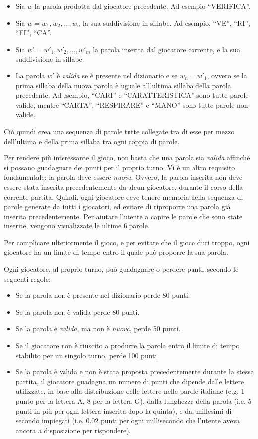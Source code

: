 \documentclass[10.5pt]{article}
\begin{document}
\begin{itemize}
\item Sia $w$ la parola prodotta dal giocatore precedente. Ad esempio ``VERIFICA''.
\item Sia $w=w_1, w_2, \dots, w_n$ la sua suddivisione in sillabe. Ad esempio, ``VE'', ``RI'', ``FI'', ``CA''.
\item Sia $w'=w'_1, w'_2, \dots, w'_m$ la parola inserita dal giocatore corrente, e la sua suddivisione in sillabe.
\item La parola $w'$ è \emph{valida} se è presente nel dizionario e se $w_n = w'_1$, ovvero se la prima sillaba della nuova parola è uguale all'ultima sillaba della parola precedente. Ad esempio, ``CARI'' e ``CARATTERISTICA'' sono tutte parole valide, mentre ``CARTA'', ``RESPIRARE'' e ``MANO'' sono tutte parole non valide.
\end{itemize}

Ciò quindi crea una sequenza di parole tutte collegate tra di esse per mezzo dell'ultima e della prima sillaba tra ogni coppia di parole. 

Per rendere più interessante il gioco, non basta che una parola sia \emph{valida} affinché si possano guadagnare dei punti per il proprio turno. Vi è un altro requisito fondamentale: la parola deve essere \emph{nuova}. Ovvero, la parola inserita non deve essere stata inserita precedentemente da alcun giocatore, durante il corso della corrente partita. Quindi, ogni giocatore deve tenere memoria della sequenza di parole generate da tutti i giocatori, ed evitare di riproporre una parola già inserita precedentemente. Per aiutare l'utente a capire le parole che sono state inserite, vengono visualizzate le ultime 6 parole.

Per complicare ulteriormente il gioco, e per evitare che il gioco duri troppo, ogni giocatore ha un limite di tempo entro il quale può proporre la sua parola.

Ogni giocatore, al proprio turno, può guadagnare o perdere punti, secondo le seguenti regole:
\begin{itemize}
\item Se la parola non è presente nel dizionario perde 80 punti.
\item Se la parola non è valida perde 80 punti.
\item Se la parola è \emph{valida}, ma non è \emph{nuova}, perde 50 punti.
\item Se il giocatore non è riuscito a produrre la parola entro il limite di tempo stabilito per un singolo turno, perde 100 punti.
\item Se la parola è valida e non è stata proposta precedentemente durante la stessa partita, il giocatore guadagna un numero di punti che dipende dalle lettere utilizzate, in base alla distribuzione delle lettere nelle parole italiane (e.g. 1 punto per la lettera A, 8 per la lettera G), dalla lunghezza della parola (i.e. 5 punti in più per ogni lettera inserita dopo la quinta), e dai millesimi di secondo impiegati (i.e. 0.02 punti per ogni millisecondo che l'utente aveva ancora a disposizione per rispondere).
\end{itemize}
\end{document}
